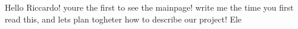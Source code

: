 \label{index_md_README}%
%
 Hello Riccardo! you\textquotesingle{}re the first to see the mainpage! write me the time you first read this, and let\textquotesingle{}s plan togheter how to describe our project! Ele 